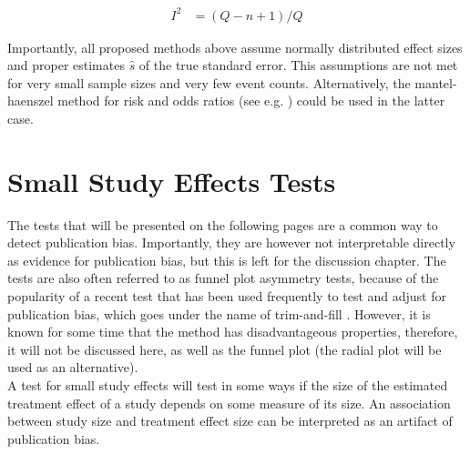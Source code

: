 \begin{align}
I^2 &= (Q - n + 1)/Q \nonumber%
\end{align}

Importantly, all proposed methods above assume normally distributed effect sizes and proper estimates $\hat{s}$ of the true standard error. This assumptions are not met for very small sample sizes and very few event counts. Alternatively, the mantel-haenszel method for risk and odds ratios (see e.g. \citet{mantel.haenszel}) could be used in the latter case. 










\section{Small Study Effects Tests}
The tests that will be presented on the following pages are a common way to detect publication bias. Importantly, they are however not interpretable directly as evidence for publication bias, but this is left for the discussion chapter. The tests are also often referred to as funnel plot asymmetry tests, because of the popularity of a recent test that has been used frequently to test and adjust for publication bias, which goes under the name of trim-and-fill \citet{trimfill}. However, it is known for some time that the method has disadvantageous properties, therefore, it will not be discussed here, as well as the funnel plot (the radial plot will be used as an alternative).\\
A test for small study effects will test in some ways if the size of the estimated treatment effect of a study depends on some measure of its size. An association between study size and treatment effect size can be interpreted as an artifact of publication bias.

